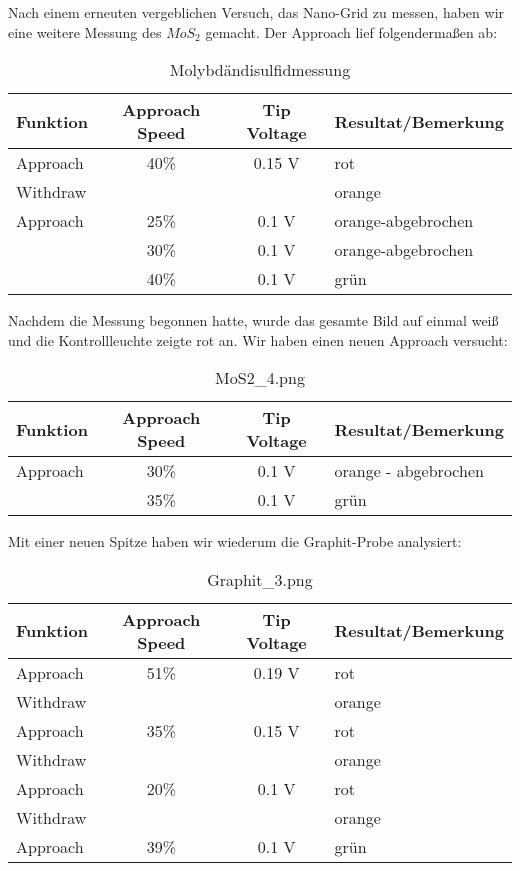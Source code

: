 Nach einem erneuten vergeblichen Versuch, das Nano-Grid zu messen, haben wir eine weitere Messung des $MoS_2$ gemacht. Der Approach lief folgendermaßen ab:

\begin{table}[H]
\caption{Molybdändisulfidmessung}
\centering \begin{tabular}[H]{l c c l} 
Funktion & Approach Speed & Tip Voltage & Resultat/Bemerkung\\ \hline
Approach & 40\% & 0.15 V & rot\\
Withdraw & & & orange\\
Approach & 25\% & 0.1 V & orange-abgebrochen\\
 & 30\% & 0.1 V & orange-abgebrochen\\
 & 40\% & 0.1 V & grün\\
\end{tabular}
\end{table}

Nachdem die Messung begonnen hatte, wurde das gesamte Bild auf einmal weiß und die Kontrollleuchte zeigte rot an. Wir haben einen neuen Approach versucht:

\begin{table}[H]
\caption{MoS2\_4.png}
\centering \begin{tabular}[H]{l c c l}
Funktion & Approach Speed & Tip Voltage & Resultat/Bemerkung\\ \hline
Approach & 30\% & 0.1 V & orange - abgebrochen\\
 & 35\% & 0.1 V & grün
\end{tabular}
\end{table}


Mit einer neuen Spitze haben wir wiederum die Graphit-Probe analysiert:

\begin{table}[H]
\caption{Graphit\_3.png}
\centering \begin{tabular}[H]{l c c l}
Funktion & Approach Speed & Tip Voltage & Resultat/Bemerkung\\ \hline
Approach & 51\% & 0.19 V & rot\\
Withdraw & & & orange\\
Approach & 35\% & 0.15 V & rot\\
Withdraw & & & orange\\
Approach& 20\% & 0.1 V & rot\\
Withdraw & & & orange\\
Approach & 39\% & 0.1 V & grün\\
\end{tabular}
\end{table}

